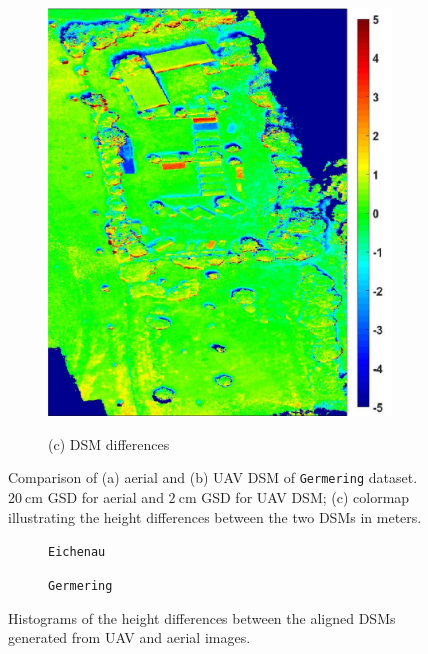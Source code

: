 \begin{figure}[tbp]
\begin{subfigure}[b]{0.35\columnwidth}
           \includegraphics[width=\textwidth]{figures_5/germering_dsm_dif.jpg}
           {{\small }}    
           \centerline{\small{(c) DSM differences}}\medskip
       \end{subfigure}
       \caption{Comparison of (a) aerial and (b) UAV DSM of \texttt{Germering} dataset. $\SI{20}{\cm}$ GSD for aerial and $\SI{2}{\cm}$ GSD for UAV DSM; (c) colormap illustrating the height differences between the two DSMs in meters.}
       \label{fig:dsm_germering}
\end{figure}

\begin{figure}[tbp]
       \begin{subfigure}[c]{0.5\linewidth}
	       \centering
			
			\caption{\label{fig:1} \texttt{Eichenau}}
       \end{subfigure}
       \begin{subfigure}[c]{0.5\linewidth}  
	       \centering
			
			\caption{\label{fig:1} \texttt{Germering}}
       \end{subfigure}
       \caption{Histograms of the height differences between the aligned DSMs generated from UAV and aerial images.}
       \label{fig:dsm_errs}
\end{figure}

